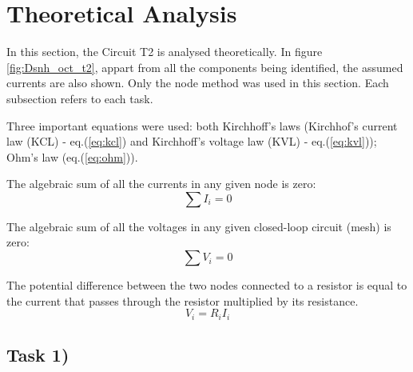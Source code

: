 
\section{Theoretical Analysis}
\label{sec:analysis}



In this section, the Circuit T2 is analysed theoretically. In figure \ref{fig:Dsnh_oct_t2},
appart from all the components being identified, the assumed currents are also shown.
Only the node method was used in this section. Each subsection refers to each task.


Three important equations were used: both Kirchhoff's laws (Kirchhof's current law (KCL)
- eq.(\ref{eq:kcl}) and Kirchhoff's voltage law (KVL) - eq.(\ref{eq:kvl})); Ohm's law
(eq.(\ref{eq:ohm})).

The algebraic sum of all the currents in any given node is zero:
\begin{equation}
	\sum I_i = 0
	\label{eq:kcl}
\end{equation}

The algebraic sum of all the voltages in any given closed-loop circuit (mesh) is zero:
\begin{equation}
	\sum V_i = 0
	\label{eq:kvl}
\end{equation}

The potential difference between the two nodes connected to a resistor is equal to the current that 
passes through the resistor multiplied by its resistance.
\begin{equation}
	V_i = R_iI_i
	\label{eq:ohm}
\end{equation}


\subsection{Task 1)}
\label{subsec:task1_a}


